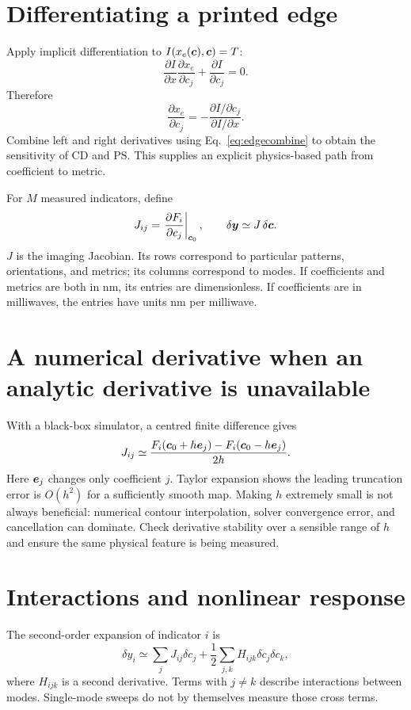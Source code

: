 \section{Differentiating a printed edge}
Apply implicit differentiation to
$I(x_e(\bm{c}),\bm{c})=T$:
\[
\frac{\partial I}{\partial x}\frac{\partial x_e}{\partial c_j}
+\frac{\partial I}{\partial c_j}=0.
\]
Therefore
\begin{equation}
\frac{\partial x_e}{\partial c_j}
=-\frac{\partial I/\partial c_j}{\partial I/\partial x}.
\label{eq:edgeSensitivity}
\end{equation}
Combine left and right derivatives using Eq.~\eqref{eq:edgecombine}
to obtain the sensitivity of CD and PS. This supplies an explicit
physics-based path from coefficient to metric.

For $M$ measured indicators, define
\begin{equation}
J_{ij}=\left.\frac{\partial F_i}{\partial c_j}\right|_{\bm{c}_0},
\qquad
\delta\bm{y}\simeq J\,\delta\bm{c}.
\label{eq:sensitivity}
\end{equation}
$J$ is the imaging Jacobian. Its rows correspond to particular patterns,
orientations, and metrics; its columns correspond to modes.
If coefficients and metrics are both in nm, its entries are dimensionless.
If coefficients are in milliwaves, the entries have units
nm per milliwave.

\section{A numerical derivative when an analytic derivative is unavailable}
With a black-box simulator, a centred finite difference gives
\begin{equation}
J_{ij}\simeq
\frac{F_i(\bm{c}_0+h\bm{e}_j)-F_i(\bm{c}_0-h\bm{e}_j)}{2h}.
\label{eq:finitedifference}
\end{equation}
Here $\bm{e}_j$ changes only coefficient $j$.
Taylor expansion shows the leading truncation error is $O(h^2)$ for
a sufficiently smooth map.
Making $h$ extremely small is not always beneficial: numerical contour
interpolation, solver convergence error, and cancellation can dominate.
Check derivative stability over a sensible range of $h$ and ensure
the same physical feature is being measured.

\section{Interactions and nonlinear response}
The second-order expansion of indicator $i$ is
\begin{equation}
\delta y_i\simeq\sum_jJ_{ij}\delta c_j+
\frac12\sum_{j,k}H_{ijk}\delta c_j\delta c_k,
\end{equation}
where $H_{ijk}$ is a second derivative. Terms with $j\ne k$ describe
interactions between modes. Single-mode sweeps do not by themselves
measure those cross terms.

